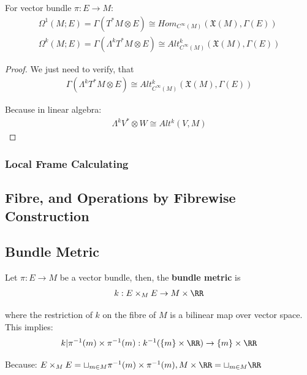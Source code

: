 \documentclass[Total.tex]{subfiles}
\begin{document}
				\begin{proposition}
					For vector bundle $\pi:E\rightarrow M$:
					\begin{gather*}
						\Omega^1(M;E)=\Gamma(T^*M\otimes E)\cong Hom_{C^\infty(M)}(\mathfrak{X}(M),\Gamma(E))\\
						\Omega^k(M;E)=\Gamma(\Lambda^k T^* M\otimes E)\cong Alt^k_{C^\infty(M)}(\mathfrak{X}(M),\Gamma(E))
 					\end{gather*}
				\end{proposition}
				\begin{proof}
					We just need to verify, that
					\begin{gather*}
						\Gamma(\Lambda^k T^*M\otimes E)\cong Alt^k_{C^\infty(M)}(\mathfrak{X}(M),\Gamma(E))
					\end{gather*}
					
					Because in linear algebra:
					\begin{gather*}
						\Lambda^k V^*\otimes W\cong Alt^k(V,M)
					\end{gather*}
				\end{proof}
				
			\subsubsection{Local Frame Calculating}
			
			
			\subsection{Fibre, and Operations by Fibrewise Construction}
			
			\subsection{Bundle Metric}
				\begin{Def}
					Let $\pi:E\rightarrow M$ be a vector bundle, then, the \textbf{bundle metric} is 
					\begin{gather*}
						k:E\times_M E\rightarrow M\times \RR
					\end{gather*}
					
					where the restriction of $k$ on the fibre of $M$ is a bilinear map over vector space. This implies: 
					\begin{gather*}
						k|\pi^{-1}(m)\times \pi^{-1}(m):k^{-1}(\{m\}\times \RR)\rightarrow \{m\}\times \RR
					\end{gather*}
					
					Because: $E\times_M E=\sqcup_{m\in M} \pi^{-1}(m)\times \pi^{-1}(m),M\times \RR=\sqcup_{m\in M} \RR$
				\end{Def}
				
\end{document}
